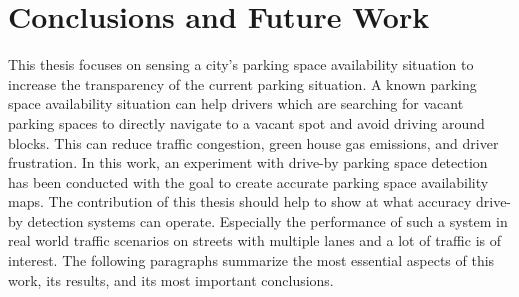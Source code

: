 \chapter{Conclusions and Future Work}
\label{chap:conclusion}



This thesis focuses on sensing a city's parking space availability situation to increase the transparency of the current parking situation. 
A known parking space availability situation can help drivers which are searching for vacant parking spaces to directly navigate to a vacant spot and avoid driving around blocks. This can reduce traffic congestion, green house gas emissions, and driver frustration. 
In this work, an experiment with drive-by parking space detection has been conducted with the goal to create accurate parking space availability maps. The contribution of this thesis should help to show at what accuracy drive-by detection systems can operate. Especially the performance of such a system in real world traffic scenarios on streets with multiple lanes and a lot of traffic is of interest.
The following paragraphs summarize the most essential aspects of this work, its results, and its most important conclusions.


